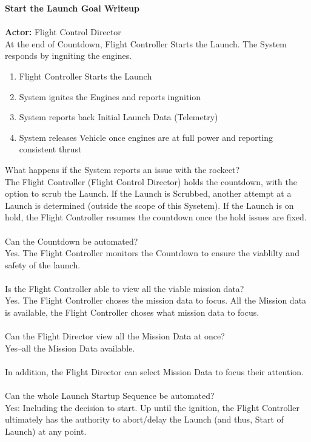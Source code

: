 \documentclass[letterpaper]{article}
\begin{document}
\noindent
\textbf{Start the Launch Goal Writeup}\\\\
\textbf{Actor:  }Flight Control Director\\
At the end of Countdown, Flight Controller Starts the Launch.  The
System responds by ingniting the engines.
\begin{enumerate}
\item Flight Controller Starts the Launch
\item System ignites the Engines and reports ingnition
\item System reports back Initial Launch Data (Telemetry)
\item System releases Vehicle once engines are at full power and
reporting consistent thrust
\end{enumerate}
What happens if the System reports an issue with the rockect?\\
The Flight Controller (Flight Control Director) holds the countdown,
with the option to scrub the Launch.  If the Launch is Scrubbed,
another attempt at a Launch is determined (outside the scope of this
Sysetem).  If the Launch is on hold, the Flight Controller resumes the
countdown once the hold issues are fixed.\\\\
Can the Countdown be automated?\\
Yes.  The Flight Controller monitors the Countdown to ensure the
viablilty and safety of the launch.\\\\
Is the Flight Controller able to view all the viable mission data?\\
Yes.  The Flight Controller choses the mission data to focus.  All the
Mission data is available, the Flight Controller choses what mission
data to focus.\\\\
Can the Flight Director view all the Mission Data at once?\\
Yes--all the Mission Data available.\\\\
In addition, the Flight Director can select Mission Data to focus
their attention.\\\\
Can the whole Launch Startup Sequence be automated?\\
Yes:  Including the decision to start.  Up until the ignition, the
Flight Controller ultimately has the authority to abort/delay the
Launch (and thus, Start of Launch) at any point.
\end{document}

